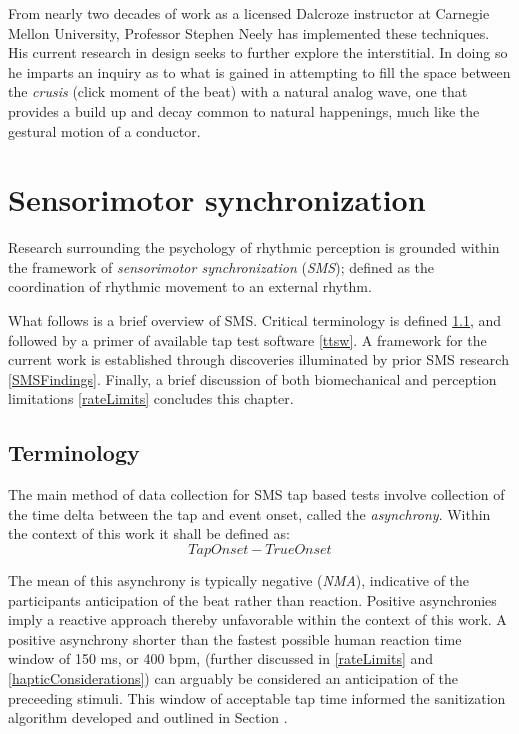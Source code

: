 From nearly two decades of work as a licensed Dalcroze instructor at Carnegie Mellon University, Professor Stephen Neely has implemented these techniques. His current research in design seeks to further explore the interstitial. In doing so he imparts an inquiry as to what is gained in attempting to fill the space between the \textit{crusis} (click moment of the beat) with a natural analog wave, one that provides a build up and decay common to natural happenings, much like the gestural motion of a conductor.

\section{Sensorimotor synchronization}
Research surrounding the psychology of rhythmic perception is grounded within the framework of \textit{sensorimotor synchronization} (\textit{SMS}); defined as the coordination of rhythmic movement to an external rhythm. 

What follows is a brief overview of SMS. Critical terminology is defined \ref{SMSTerms}, and followed by a primer of available tap test software \ref{ttsw}. A framework for the current work is established through discoveries illuminated by prior SMS research \ref{SMSFindings}. Finally, a brief discussion of both biomechanical and perception limitations \ref{rateLimits} concludes this chapter.

\subsection{Terminology} \label{SMSTerms}
The main method of data collection for SMS tap based tests involve collection of the time delta between the tap and event onset, called the \textit{asynchrony}. Within the context of this work it shall be defined as:
\begin{equation*}Tap Onset-True Onset\end{equation*} 

The mean of this asynchrony is typically negative (\textit{NMA}), indicative of the participants anticipation of the beat rather than reaction. Positive asynchronies imply a reactive approach thereby unfavorable within the context of this work. A positive asynchrony shorter than the fastest possible human reaction time window of 150 ms, or 400 bpm, (further discussed in \ref{rateLimits} and \ref{hapticConsiderations}) can arguably be considered an anticipation of the preceeding stimuli. This window of acceptable tap time informed the sanitization algorithm developed and outlined in Section \label{sanitizationProcedure}.

